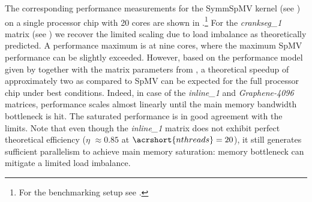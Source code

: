 The corresponding performance measurements for the \acrshort{SymmSpMV} kernel
(see ) on a single \SKX processor chip with 20 cores are
shown in .\footnote{For the benchmarking setup
see .}
For the \emph{crankseg\_1} matrix (see ) we recover
the limited scaling due to load imbalance as theoretically predicted. A
performance maximum is at nine cores, where the maximum \acrshort{SpMV}
performance can be slightly exceeded. However, based on the \roofline performance
model given by  together with
the matrix parameters from , a theoretical speedup of
approximately two as compared to \acrshort{SpMV} can be expected for the full
processor chip under best conditions.
Indeed, in case of the \emph{inline\_1} and \emph{Graphene-4096}
matrices, performance
scales almost linearly until the main memory bandwidth bottleneck is hit. The
saturated performance is in good agreement with the \roofline limits.
Note that even though the \emph{inline\_1} matrix does not exhibit
perfect theoretical efficiency ($\eta$ $\approx 0.85$ at
$\acrshort{nthreads}=20$), it still generates sufficient parallelism to achieve
main memory saturation:   memory bottleneck can mitigate
a limited load imbalance.

